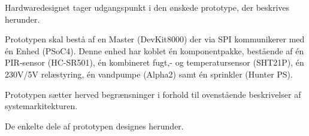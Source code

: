 Hardwaredesignet tager udgangspunkt i den ønskede prototype, der beskrives herunder.

Prototypen skal bestå af en Master (DevKit8000) der via SPI kommunikerer med én Enhed (PSoC4). Denne enhed har koblet én komponentpakke, bestående af én PIR-sensor (HC-SR501), én kombineret fugt,- og temperatursensor (SHT21P), én 230V/5V relæstyring, én vandpumpe (Alpha2) samt én sprinkler (Hunter PS).

Prototypen sætter herved begrænsninger i forhold til ovenstående beskrivelser af systemarkitekturen.

De enkelte dele af prototypen designes herunder.   


